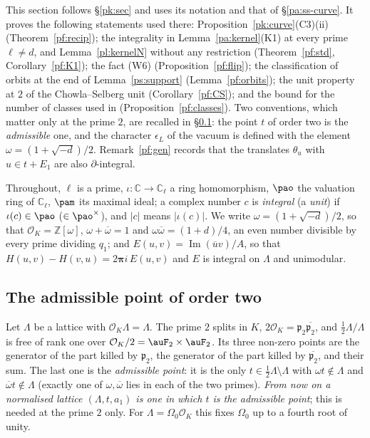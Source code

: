 \documentclass[10pt]{amsart}
\theoremstyle{definition}
\theoremstyle{remark}
\newcommand{\C}{\mathbb C}
\newcommand{\Z}{\mathbb Z}
\newcommand{\Iml}{\operatorname{Im}}
\providecommand{\auO}{\mathcal O}
\providecommand{\aubar}[1]{\overline{#1}}
\begin{document}
This section follows \S\ref{pk:sec} and uses its notation and that of \S\ref{pa:ss-curve}. It
proves the following statements used there: Proposition~\ref{pk:curve}(C3)(ii)
(Theorem~\ref{pf:recip}); the integrality in Lemma~\ref{pa:kernel}(K1) at every prime $\ell\ne d$,
and Lemma~\ref{pl:kernelN} without any restriction (Theorem~\ref{pf:std},
Corollary~\ref{pf:K1}); the fact (W6) (Proposition~\ref{pf:flip}); the classification of orbits at
the end of Lemma~\ref{ps:support} (Lemma~\ref{pf:orbits}); the unit property at $2$ of the
Chowla--Selberg unit (Corollary~\ref{pf:CS}); and the bound for the number of classes used in
{\cite[Propositions~14.26 and~14.28]{P46}} (Proposition~\ref{pf:classes}). Two conventions, which matter
only at the prime $2$, are recalled in \S\ref{pf:ss-adm}: the point $t$ of order two is the
\emph{admissible} one, and the character $\epsilon_L$ of the vacuum is defined with the element
$\omega=(1+\sqrt{-d})/2$. Remark~\ref{pf:gen} records that the translates $\theta_u$ with
$u\in t+E_1$ are also $\partial$-integral.

Throughout, $\ell$ is a prime, $\iota\colon\C\to\C_\ell$ a ring homomorphism, $\pao$ the valuation
ring of $\C_\ell$, $\pam$ its maximal ideal; a complex number $c$ is \emph{integral} (a
\emph{unit}) if $\iota(c)\in\pao$ ($\in\pao^\times$), and $|c|$ means $|\iota(c)|$. We write
$\omega=(1+\sqrt{-d})/2$, so that $\auO_K=\Z[\omega]$, $\omega+\aubar\omega=1$ and
$\omega\aubar\omega=(1+d)/4$, an even number divisible by every prime dividing $q_1$; and
$E(u,v)=\Iml(\aubar uv)/A$, so that $H(u,v)-H(v,u)=2\boldsymbol\pi i\,E(u,v)$ and $E$ is integral
on $\Lambda$ and unimodular.

\subsection{The admissible point of order two}\label{pf:ss-adm}

Let $\Lambda$ be a lattice with $\auO_K\Lambda=\Lambda$. The prime $2$ splits in $K$,
$2\auO_K=\mathfrak p_2\aubar{\mathfrak p_2}$, and $\tfrac12\Lambda/\Lambda$ is free of rank one over
$\auO_K/2=\auF_2\times\auF_2$. Its three non-zero points are the generator of the part killed by
$\mathfrak p_2$, the generator of the part killed by $\aubar{\mathfrak p_2}$, and their sum. The
last one is the \emph{admissible point}: it is the only $t\in\tfrac12\Lambda\setminus\Lambda$ with
$\omega t\notin\Lambda$ and $\aubar\omega t\notin\Lambda$ (exactly one of $\omega,\aubar\omega$ lies
in each of the two primes). \emph{From now on a normalised lattice $(\Lambda,t,a_1)$ is one in which
$t$ is the admissible point}; this is needed at the prime $2$ only. For $\Lambda=\Omega_0\auO_K$ this fixes $\Omega_0$ up to a fourth root of unity.
\end{document}
